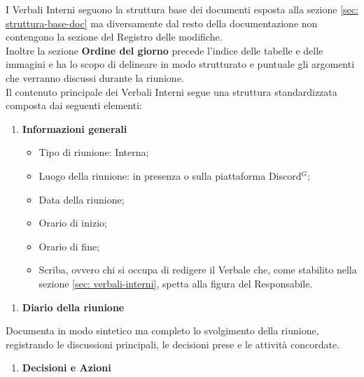 \label{sec:verbali-interni}
I Verbali Interni seguono la struttura base dei documenti esposta alla sezione \ref{sec: struttura-base-doc} ma diversamente dal resto della documentazione non contengono la sezione del Registro delle modifiche.\\
Inoltre la sezione \textbf{Ordine del giorno} precede l'indice delle tabelle e delle immagini e ha lo scopo di delineare in modo strutturato e puntuale gli argomenti che verranno discussi durante la riunione.\\
Il contenuto principale dei Verbali Interni segue una struttura standardizzata composta dai seguenti elementi: \vspace{-0.5em}

    \begin{enumerate}[label=\arabic*., itemsep=0pt, parsep=1pt, leftmargin=*]
        \item \textbf{Informazioni generali}
        \begin{itemize}[label=--, itemsep=0pt, parsep=1pt, leftmargin=1.5em]
            \item Tipo di riunione: Interna;
            \item Luogo della riunione: in presenza o sulla piattaforma Discord$^G$;
            \item Data della riunione;
            \item Orario di inizio; 
            \item Orario di fine;
            \item Scriba, ovvero chi si occupa di redigere il Verbale che, come stabilito nella sezione \ref{sec: verbali-interni}, spetta alla figura del Responsabile.
        \end{itemize}
    \end{enumerate}

    \begin{enumerate}[resume*, itemsep=0pt, parsep=1pt, leftmargin=*, label=\arabic*.]
        \item \textbf{Diario della riunione}
    \end{enumerate}

    \vspace{-0.5em}
    Documenta in modo sintetico ma completo lo svolgimento della riunione, registrando le discussioni principali, le decisioni prese e le attività concordate.

    \begin{enumerate}[resume*, itemsep=0pt, parsep=1pt, leftmargin=*, label=\arabic*.]
        \item \textbf{Decisioni e Azioni}
    \end{enumerate}

